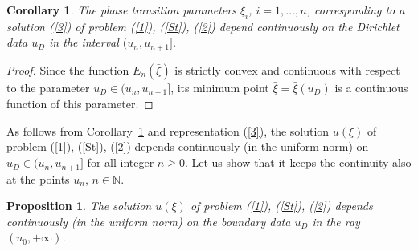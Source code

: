 \documentclass[10pt,a4paper]{amsart}
\newtheorem{proposition}{Proposition}[section]
\newtheorem{corollary}{Corollary}[section]
\numberwithin{equation}{section}
\newcommand{\N}{{\mathbb N}}
\begin{document}
\begin{corollary}\label{cor1}
The phase transition parameters $\xi_i$, $i=1,\ldots,n$, corresponding to a solution (\ref{3}) of problem (\ref{1}), (\ref{St}), (\ref{2}) depend continuously on the Dirichlet data $u_D$ in the interval $(u_n,u_{n+1}]$.
\end{corollary}
\begin{proof}
Since the function $E_n(\bar\xi)$ is strictly convex and continuous with respect to the parameter $u_D\in (u_n,u_{n+1}]$, its minimum point $\bar\xi=\bar\xi(u_D)$ is a continuous function of this parameter.
\end{proof}
As follows from Corollary~\ref{cor1} and representation (\ref{3}), the solution $u(\xi)$ of problem (\ref{1}), (\ref{St}), (\ref{2}) depends continuously (in the uniform norm) on $u_D\in (u_n,u_{n+1}]$ for all integer $n\ge 0$. Let us show that it keeps the continuity also at the points $u_n$, $n\in\N$.

\begin{proposition}\label{pro1}
The solution $u(\xi)$ of problem (\ref{1}), (\ref{St}), (\ref{2}) depends continuously (in the uniform norm) on the boundary data $u_D$ in the ray $(u_0,+\infty)$.
\end{proposition}
\end{document}
